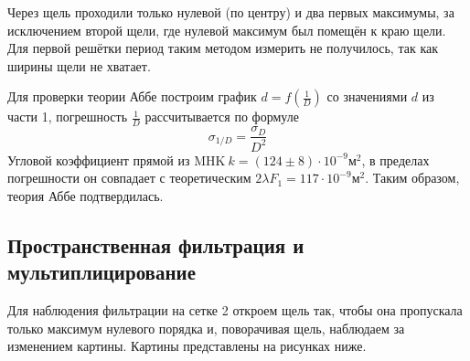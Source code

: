 \newline
\newline


Через щель проходили только нулевой (по центру) и два первых максимумы, за исключением второй щели, где нулевой максимум был помещён к краю щели. Для первой решётки
период таким методом измерить не получилось, так как ширины щели не хватает.

Для проверки теории Аббе построим график $d=f\left(\frac{1}{D}\right)$ со значениями $d$ из части 1, погрешность $\frac{1}{D}$ рассчитывается по формуле
$$
\sigma_{1 / D}=\frac{\sigma_{D}}{D^{2}}
$$
Угловой коэффициент прямой из $\mathrm{MHK}\ k=(124 \pm 8) \cdot 10^{-9} м^{2}$, в пределах погрешности он совпадает с теоретическим $2 \lambda F_{1}= 117\cdot 10^{-9} м^{2} .$ Таким образом, теория Аббе подтвердилась. 
   
 \subsection*{Пространственная фильтрация и мультиплицирование}
 
 Для наблюдения фильтрации на сетке 2 откроем щель так, чтобы она пропускала только максимум нулевого порядка и, поворачивая щель, наблюдаем за изменением картины. Картины представлены на рисунках ниже. \\
 
